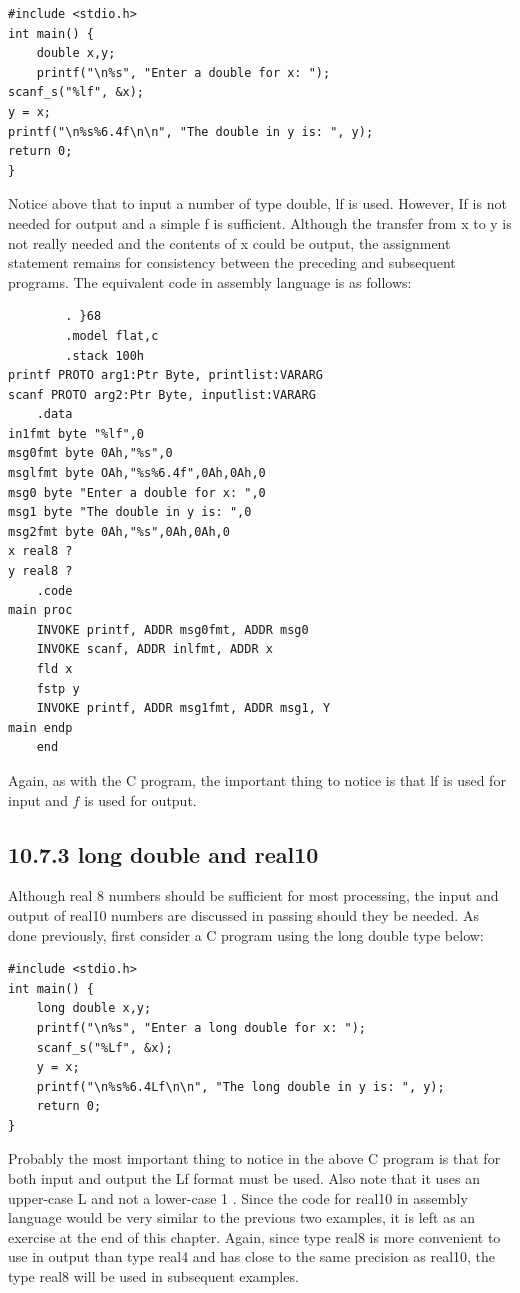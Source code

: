 \documentclass[10pt]{book}
\begin{document}
\begin{center}
\begin{center}
\begin{center}
\begin{center}
\begin{verbatim}
#include <stdio.h>
int main() {
    double x,y;
    printf("\n%s", "Enter a double for x: ");
scanf_s("%lf", &x);
y = x;
printf("\n%s%6.4f\n\n", "The double in y is: ", y);
return 0;
}
\end{verbatim}

Notice above that to input a number of type double, lf is used. However, If is not needed for output and a simple f is sufficient. Although the transfer from x to y is not really needed and the contents of x could be output, the assignment statement remains for consistency between the preceding and subsequent programs. The equivalent code in assembly language is as follows:


\begin{verbatim}
        . }68
        .model flat,c
        .stack 100h
printf PROTO arg1:Ptr Byte, printlist:VARARG
scanf PROTO arg2:Ptr Byte, inputlist:VARARG
    .data
in1fmt byte "%lf",0
msg0fmt byte 0Ah,"%s",0
msglfmt byte OAh,"%s%6.4f",0Ah,0Ah,0
msg0 byte "Enter a double for x: ",0
msg1 byte "The double in y is: ",0
msg2fmt byte 0Ah,"%s",0Ah,0Ah,0
x real8 ?
y real8 ?
    .code
main proc
    INVOKE printf, ADDR msg0fmt, ADDR msg0
    INVOKE scanf, ADDR inlfmt, ADDR x
    fld x
    fstp y
    INVOKE printf, ADDR msg1fmt, ADDR msg1, Y
main endp
    end
\end{verbatim}

Again, as with the C program, the important thing to notice is that lf is used for input and $f$ is used for output.

\subsection*{10.7.3 long double and real10}
Although real 8 numbers should be sufficient for most processing, the input and output of real10 numbers are discussed in passing should they be needed. As done previously, first consider a C program using the long double type below:

\begin{verbatim}
#include <stdio.h>
int main() {
    long double x,y;
    printf("\n%s", "Enter a long double for x: ");
    scanf_s("%Lf", &x);
    y = x;
    printf("\n%s%6.4Lf\n\n", "The long double in y is: ", y);
    return 0;
}
\end{verbatim}

Probably the most important thing to notice in the above C program is that for both input and output the Lf format must be used. Also note that it uses an upper-case L and not a lower-case 1 . Since the code for real10 in assembly language would be very similar to the previous two examples, it is left as an exercise at the end of this chapter. Again, since type real8 is more convenient to use in output than type real4 and has close to the same precision as real10, the type real8 will be used in subsequent examples.


\end{center}
\end{center}
\end{center}
\end{center}
\end{document}
